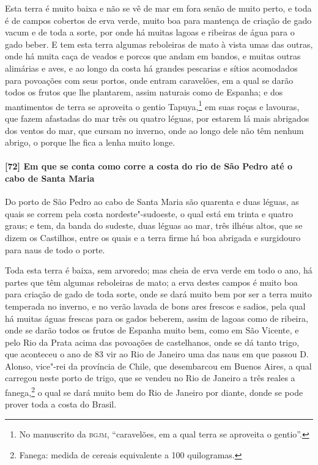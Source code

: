 Esta terra é muito baixa e não se vê de mar em fora senão de muito perto, e toda é de
campos cobertos de erva verde, muito boa para mantença de criação de gado vacum e de toda
a sorte, por onde há muitas lagoas e ribeiras de água para o gado beber. E tem esta terra
algumas reboleiras de mato à vista umas das outras, onde há muita caça de veados e porcos
que andam em bandos, e muitas outras alimárias e aves, e ao longo da costa há grandes
pescarias e sítios acomodados para povoações com seus portos, onde entram caravelões, em a
qual se darão todos os frutos que lhe plantarem, assim naturais como de Espanha; e dos
mantimentos de terra se aproveita o gentio Tapuya,\footnote{ No manuscrito da
\textsc{bgjm}, ``caravelões, em a qual terra se aproveita o gentio''.} em suas roças e
lavouras, que fazem afastadas do mar três ou quatro léguas, por estarem lá mais abrigados
dos ventos do mar, que cursam no inverno, onde ao longo dele não têm nenhum abrigo, o
porque lhe fica a lenha muito longe.

\paragraph{[72] Em que se conta como corre a costa do rio de São Pedro até o cabo de Santa
Maria} \quad
Do porto de São Pedro ao cabo de Santa Maria são quarenta e duas léguas, as quais se
correm pela costa nordeste"-sudoeste, o qual está em trinta e quatro graus; e tem, da banda
do sudeste, duas léguas ao mar, três ilhéus altos, que se dizem os Castilhos, entre os
quais e a terra firme há boa abrigada e surgidouro para naus de todo o porte.

Toda esta terra é baixa, sem arvoredo; mas cheia de erva verde em todo o ano, há partes
que têm algumas reboleiras de mato; a erva destes campos é muito boa para criação de gado
de toda sorte, onde se dará muito bem por ser a terra muito temperada no inverno, e no
verão lavada de bons ares frescos e sadios, pela qual há muitas águas frescas para os
gados beberem, assim de lagoas como de ribeira, onde se darão todos os frutos de Espanha
muito bem, como em São Vicente, e pelo Rio da Prata acima das povoações de castelhanos,
onde se dá tanto trigo, que aconteceu o ano de 83 vir ao Rio de Janeiro uma das naus em
que passou D. Alonso, vice"-rei da província de Chile, que desembarcou em Buenos Aires, a
qual carregou neste porto de trigo, que se vendeu no Rio de Janeiro a três reales a
fanega,\footnote{ Fanega: medida de cereais equivalente a 100 quilogramas.} o qual se dará
muito bem do Rio de Janeiro por diante, donde se pode prover toda a costa do Brasil.

